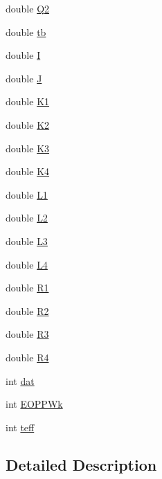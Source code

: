 \begin{CompactItemize}
\item 
double \hyperlink{struct_lgm___nga_eopp_0bb5cae858fc5029a6d950063227934f}{Q2}
\item 
double \hyperlink{struct_lgm___nga_eopp_4bc6ff5e2b9663d2ceb6619b60b3908e}{tb}
\item 
double \hyperlink{struct_lgm___nga_eopp_07eb382f5743a852ab6f175e5db993f9}{I}
\item 
double \hyperlink{struct_lgm___nga_eopp_229fe836529a54bc8a7d390148d7a488}{J}
\item 
double \hyperlink{struct_lgm___nga_eopp_9f00f56b6145687842cf478b182b8f36}{K1}
\item 
double \hyperlink{struct_lgm___nga_eopp_2e65f840fe090660c4e720b3734e6097}{K2}
\item 
double \hyperlink{struct_lgm___nga_eopp_bdb2b6a7192df636bda8c1f9fd81d55e}{K3}
\item 
double \hyperlink{struct_lgm___nga_eopp_d79fd8b5247c7e4ff95b48d8021c0791}{K4}
\item 
double \hyperlink{struct_lgm___nga_eopp_04e228860c09a4173c44af849a8b878f}{L1}
\item 
double \hyperlink{struct_lgm___nga_eopp_cd277e5dc13a99d961be4cfe051cfa9a}{L2}
\item 
double \hyperlink{struct_lgm___nga_eopp_613253fbbc937149391f83cefec8e022}{L3}
\item 
double \hyperlink{struct_lgm___nga_eopp_81588e63425dc1795208aafbb8095e5e}{L4}
\item 
double \hyperlink{struct_lgm___nga_eopp_f404f6d9a332838b9707056c27a4f21a}{R1}
\item 
double \hyperlink{struct_lgm___nga_eopp_6e4ea5fe1993f05924fa4d457def2aa3}{R2}
\item 
double \hyperlink{struct_lgm___nga_eopp_6752016f7a02ff6ff1b749623be15dbb}{R3}
\item 
double \hyperlink{struct_lgm___nga_eopp_f6474ec4ce3b123a435f2b0f453d0aba}{R4}
\item 
int \hyperlink{struct_lgm___nga_eopp_83c4f9536e205d6be81cfeef517a3ab2}{dat}
\item 
int \hyperlink{struct_lgm___nga_eopp_7501e808549be41d41d0be07160bab87}{EOPPWk}
\item 
int \hyperlink{struct_lgm___nga_eopp_fb6dbc9814ae0e9f6a3147a5de51e70f}{teff}
\end{CompactItemize}


\subsection{Detailed Description}


